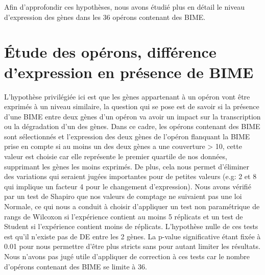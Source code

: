 \documentclass[12pt,a4paper]{report}
\begin{document}
\begin{onehalfspace}
Afin d'approfondir ces hypothèses, nous avons étudié plus en détail le niveau d'expression des gènes dans les 36 opérons contenant des BIME.

\section*{Étude des opérons, différence d'expression en présence de BIME}
L'hypothèse privilégiée ici est que les gènes appartenant à un opéron vont être exprimés à un niveau similaire, la question qui se pose est de savoir si la présence d'une BIME entre deux gènes d'un opéron va avoir un impact sur la transcription ou la dégradation d'un des gènes. Dans ce cadre, les opérons contenant des BIME sont sélectionnés et l'expression des deux gènes de l'opéron flanquant la BIME prise en compte si au moins un des deux gènes a une couverture > 10, cette valeur est choisie car elle représente le premier quartile de nos données, supprimant les gènes les moins exprimés. De plus, cela nous permet d'éliminer des variations qui seraient jugées importantes pour de petites valeurs (e.g: 2 et 8 qui implique un facteur 4 pour le changement d'expression). Nous avons vérifié par un test de Shapiro que nos valeurs de comptage ne suivaient pas une loi Normale, ce qui nous a conduit à choisir d'appliquer un test non paramétrique de rangs de Wilcoxon si l'expérience contient au moins 5 réplicats et un test de Student si l'expérience contient moins de réplicats. L'hypothèse nulle de ces tests est qu'il n'existe pas de DE entre les 2 gènes. La p-value significative étant fixée à 0.01 pour nous permettre d'être plus stricts sans pour autant limiter les résultats. Nous n'avons pas jugé utile d'appliquer de correction à ces tests car le nombre d'opérons contenant des BIME se limite à 36.


\end{onehalfspace}
\end{document}
